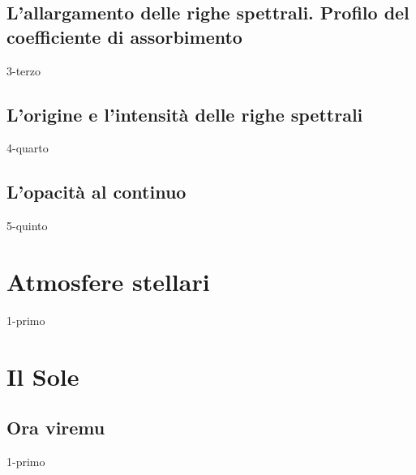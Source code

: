 \documentclass[openany,12pt]{article}
\begin{document}
  \subsection{L'allargamento delle righe spettrali. Profilo del coefficiente di assorbimento}
  {3-terzo}

  \subsection{L'origine e l'intensità delle righe spettrali}
  {4-quarto}

  \subsection{L'opacità al continuo}
  {5-quinto}

\newpage

\section{Atmosfere stellari}
  {1-primo}

\newpage

\section{Il Sole}
  \subsection{Ora viremu}
  {1-primo}
\end{document}
